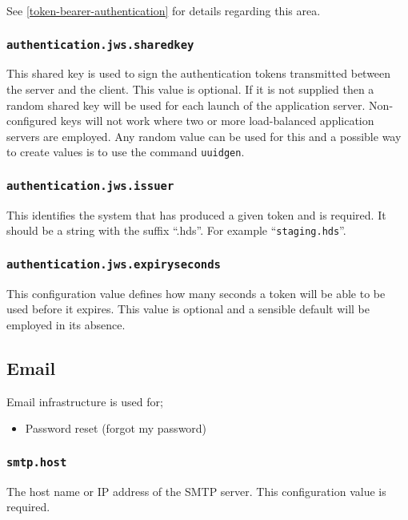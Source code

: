 See \ref{token-bearer-authentication} for details regarding this area.

\subsubsection{\tt authentication.jws.sharedkey}

This shared key is used to sign the authentication tokens transmitted between the server and the client.  This value is optional.  If it is not supplied then a random shared key will be used for each launch of the application server.  Non-configured keys will not work where two or more load-balanced application servers are employed.  Any random value can be used for this and a possible way to create values is to use the command {\tt uuidgen}.

\subsubsection{\tt authentication.jws.issuer}

This identifies the system that has produced a given token and is required.  It should be a string with the suffix ``.hds''.  For example ``{\tt staging.hds}''.

\subsubsection{\tt authentication.jws.expiryseconds}

This configuration value defines how many seconds a token will be able to be used before it expires.  This value is optional and a sensible default will be employed in its absence.

\subsection{Email}

Email infrastructure is used for;

\begin{itemize}
\item Password reset (forgot my password)
\end{itemize}

\subsubsection{\tt smtp.host}

The host name or IP address of the SMTP server.  This configuration value is required.

